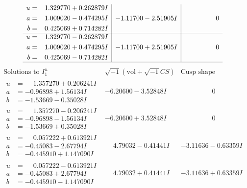 \documentclass[1p]{elsarticle_modified}
\theoremstyle{definition}
\newcommand{\I}{\sqrt{-1}}
\begin{document}
$$\begin{array}{c|c|c}
\begin{aligned}
u &= \phantom{-}1.329770 + 0.262879 I \\
a &= \phantom{-}1.009020 - 0.474295 I \\
b &= \phantom{-}0.425069 + 0.714282 I\end{aligned}
 & -1.11700 - 2.51905 I & \phantom{-0.000000 } 0 \\ \hline\begin{aligned}
u &= \phantom{-}1.329770 - 0.262879 I \\
a &= \phantom{-}1.009020 + 0.474295 I \\
b &= \phantom{-}0.425069 - 0.714282 I\end{aligned}
 & -1.11700 + 2.51905 I & \phantom{-0.000000 } 0\\
 \hline 
 \end{array}$$\newpage$$\begin{array}{c|c|c}  
\text{Solutions to }I^u_{1}& \I (\text{vol} + \sqrt{-1}CS) & \text{Cusp shape}\\
 \hline 
\begin{aligned}
u &= \phantom{-}1.357270 + 0.206241 I \\
a &= -0.96898 + 1.56134 I \\
b &= -1.53669 - 0.35028 I\end{aligned}
 & -6.20600 - 3.52848 I & \phantom{-0.000000 } 0 \\ \hline\begin{aligned}
u &= \phantom{-}1.357270 - 0.206241 I \\
a &= -0.96898 - 1.56134 I \\
b &= -1.53669 + 0.35028 I\end{aligned}
 & -6.20600 + 3.52848 I & \phantom{-0.000000 } 0 \\ \hline\begin{aligned}
u &= \phantom{-}0.057222 + 0.613921 I \\
a &= -0.45083 - 2.67794 I \\
b &= -0.445910 + 1.147090 I\end{aligned}
 & \phantom{-}4.79032 - 0.41441 I & -3.11636 - 0.63359 I \\ \hline\begin{aligned}
u &= \phantom{-}0.057222 - 0.613921 I \\
a &= -0.45083 + 2.67794 I \\
b &= -0.445910 - 1.147090 I\end{aligned}
 & \phantom{-}4.79032 + 0.41441 I & -3.11636 + 0.63359 I \\ \hline\begin{aligned}

\end{aligned}
\end{array}$$
\end{document}
